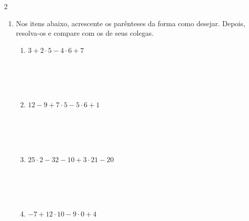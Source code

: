 \documentclass[a4paper,14pt]{article}
\begin{document}
\begin{multicols}{2}
\begin{enumerate}
\begin{enumerate}[a)]
				\item $-6 + (((4(-7 + 2)) + 8) \cdot 3)$ \\\\\\\\\\
				\item $4 \cdot 2 - 9 - 5 \cdot 3 + 16 - 23$ \\\\\\\\\\
				\item $(3 - 6) \cdot 4 + 7(2 - 4)$ \\\\\\\\\\
				\item $3 - 6 \cdot 4 + 7 \cdot 2 - 4$ \\\\\\\\\\
			\end{enumerate}
			\item Nos itens abaixo, acrescente os parênteses da forma como desejar. Depois, resolva-os e compare com os de seus colegas.
			\begin{enumerate}
				\item $3 + 2 \cdot 5 - 4 \cdot 6 + 7$ \\\\\\\\\\
				\item $12 - 9 + 7 \cdot 5 - 5 \cdot 6 + 1$ \\\\\\\\\\
				\item $25 \cdot 2 - 32 - 10 + 3 \cdot 21 - 20$ \\\\\\\\\\
				\item $-7 + 12 \cdot 10 - 9 \cdot 0 + 4$ \\\\\\\\\\

\end{enumerate}
\end{enumerate}
\end{multicols}
\end{document}
